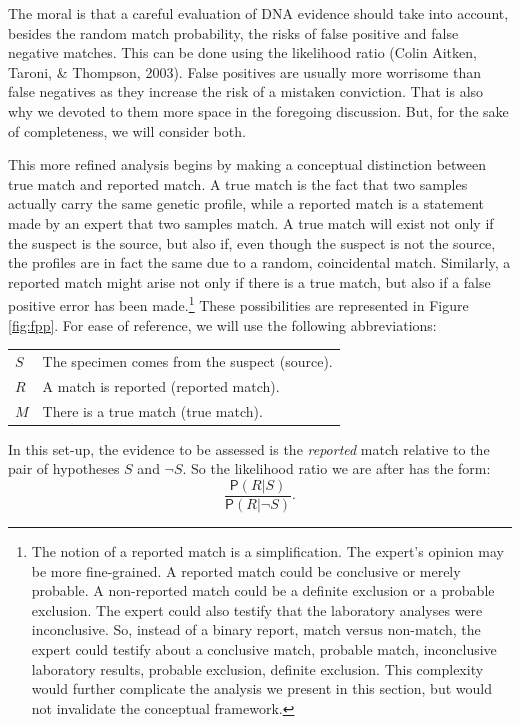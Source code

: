\documentclass[
  10pt,
  dvipsnames,enabledeprecatedfontcommands]{scrartcl}
\newcommand{\pr}[1]{\mathsf{P}(#1)}
\begin{document}
The moral is that a careful evaluation of DNA evidence should take into
account, besides the random match probability, the risks of false
positive and false negative matches. This can be done using the
likelihood ratio (Colin Aitken, Taroni, \& Thompson, 2003). False
positives are usually more worrisome than false negatives as they
increase the risk of a mistaken conviction. That is also why we devoted
to them more space in the foregoing discussion. But, for the sake of
completeness, we will consider both.

This more refined analysis begins by making a conceptual distinction
between true match and reported match. A true match is the fact that two
samples actually carry the same genetic profile, while a reported match
is a statement made by an expert that two samples match. A true match
will exist not only if the suspect is the source, but also if, even
though the suspect is not the source, the profiles are in fact the same
due to a random, coincidental match. Similarly, a reported match might
arise not only if there is a true match, but also if a false positive
error has been made.\footnote{The notion of a reported match is a
  simplification. The expert's opinion may be more fine-grained. A
  reported match could be conclusive or merely probable. A non-reported
  match could be a definite exclusion or a probable exclusion. The
  expert could also testify that the laboratory analyses were
  inconclusive. So, instead of a binary report, match versus non-match,
  the expert could testify about a conclusive match, probable match,
  inconclusive laboratory results, probable exclusion, definite
  exclusion. This complexity would further complicate the analysis we
  present in this section, but would not invalidate the conceptual
  framework.} These possibilities are represented in Figure
\ref{fig:fpp}. For ease of reference, we will use the following
abbreviations:

\begin{center} \hspace{10mm}
\begin{tabular}{lp{9cm}}
$S$ & The specimen comes from the suspect (source). \\
$R$ & A match is reported (reported match). \\
$M$ & There is a true match (true match).
\end{tabular}
\end{center}

\noindent  In this set-up, the evidence to be assessed is the
\textit{reported} match relative to the pair of hypotheses \(S\) and
\(\neg S\). So the likelihood ratio we are after has the form:
\[\frac{\pr{R \vert S}}{\pr{R \vert \neg S}}.\]
\end{document}

